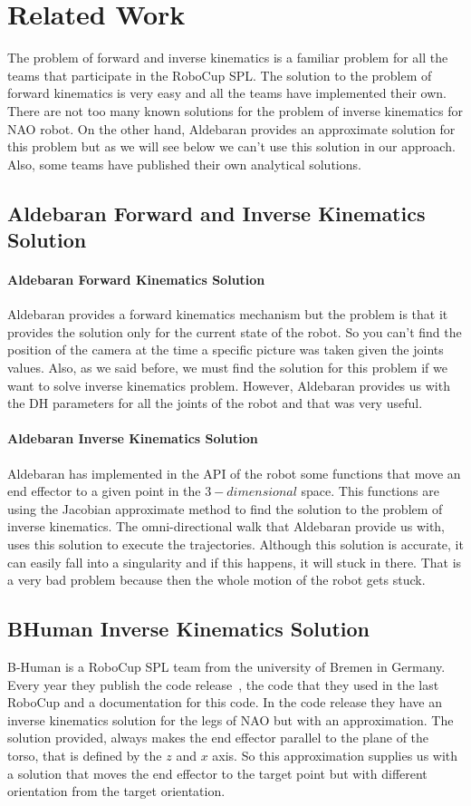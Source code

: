 \chapter{Related Work}
\label{related}
The problem of forward and inverse kinematics is a familiar problem for all the teams that participate in the RoboCup SPL. The solution to the problem of forward kinematics is very easy and all the teams have implemented their own. There are not too many known solutions for the problem of inverse kinematics for NAO robot. On the other hand, Aldebaran provides an approximate solution for this problem but as we will see below we can't use this solution in our approach. Also, some teams have published their own analytical solutions.
\section{Aldebaran Forward and Inverse Kinematics Solution}
\subsubsection*{Aldebaran Forward Kinematics Solution}
Aldebaran provides a forward kinematics mechanism but the problem is that it provides the solution only for the current state of the robot. So you can't find the position of the camera at the time a specific picture was taken given the joints values. Also, as we said before, we must find the solution for this problem if we want to solve inverse kinematics problem. However, Aldebaran provides us with the DH parameters for all the joints of the robot and that was very useful.\\ 
\subsubsection*{Aldebaran Inverse Kinematics Solution}
Aldebaran has implemented in the API of the robot some functions that move an end effector to a given point in the \(3-dimensional\) space. This functions are using the Jacobian approximate method to find the solution to the problem of inverse kinematics. The omni-directional walk that Aldebaran provide us with, uses this solution to execute the trajectories. Although this solution is accurate, it can easily fall into a singularity and if this happens, it will stuck in there. That is a very bad problem because then the whole motion of the robot gets stuck.
\section{BHuman Inverse Kinematics Solution}
B-Human is a RoboCup SPL team from the university of Bremen in Germany. Every year they publish the code release~\cite{bhuman}, the code that they used in the last RoboCup and a documentation for this code. In the code release they have an inverse kinematics solution for the legs of NAO but with an approximation. The solution provided, always makes the end effector parallel to the plane of the torso, that is defined by the \(z\) and \(x\) axis. So this approximation supplies us with a solution that moves the end effector to the target point but with different orientation from the target orientation.

